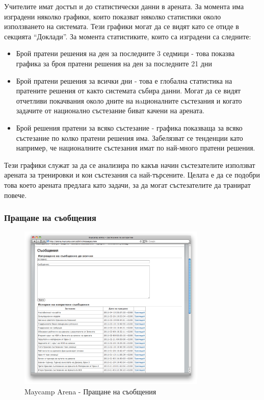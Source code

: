 \documentclass[a4paper,12pt]{article}
\begin{document}
  Учителите имат достъп и до статистически данни в арената. За момента има изградени няколко графики, които показват няколко статистики около използването на системата. Тези графики могат да се видят като се отиде в секцията ``Доклади''. За момента статистиките, които са изградени са следните:
  
  \begin{itemize}
    \item Брой пратени решения на ден за последните 3 седмици - това показва графика за броя пратени решения на ден за последните 21 дни
    \item Брой пратени решения за всички дни - това е глобална статистика на пратените решения от както системата събира данни. Могат да се видят отчетливи покачвания около дните на нaционалните състезания и когато задачите от национално състезание биват качени на арената.
    \item Брой решения пратени за всяко състезание - графика показваща за всяко състезание по колко пратени решения има. Забелязват се тенденции като например, че националните състезания имат по най-много пратени решения.
  \end{itemize}
  
  Тези графики служат за да се анализира по какъв начин състезателите използват арената за тренировки и кои състезания са най-търсените. Целата е да се подобри това което арената предлага като задачи, за да могат състезателите да транират повече.
  
  \subsubsection{Пращане на съобщения}

  \begin{figure}[ht]
    \begin{center}
      \includegraphics[width=0.8\textwidth]{images/maycamp_arena_messages.png}
    \end{center}
    \caption{Maycamp Arena - Пращане на съобщения}
    \label{arena_messages}
  \end{figure}
  
\end{document}
